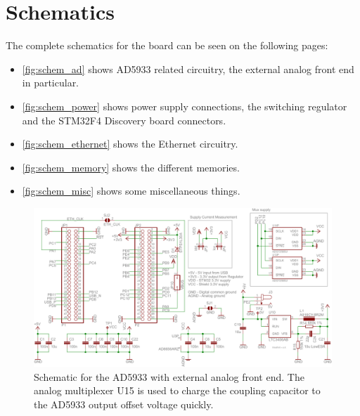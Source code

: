 \chapter{Schematics} \label{sec:schematics}

The complete schematics for the board can be seen on the following pages:
\begin{itemize}
	\item \autoref{fig:schem_ad} shows AD5933 related circuitry, the external analog front end in particular.
	\item \autoref{fig:schem_power} shows power supply connections, the switching regulator and the STM32F4 Discovery
    board connectors.
	\item \autoref{fig:schem_ethernet} shows the Ethernet circuitry.
	\item \autoref{fig:schem_memory} shows the different memories.
	\item \autoref{fig:schem_misc} shows some miscellaneous things.
\end{itemize}

\begin{figure}[htpb]
  \centering
    \includegraphics[angle=90,page=2,width=\textwidth]{bilder/schem.pdf}
  \caption{Schematic for the AD5933 with external analog front end. The analog multiplexer U15 is used to charge the
    coupling capacitor to the AD5933 output offset voltage quickly.}
  \label{fig:schem_ad}
\end{figure}

